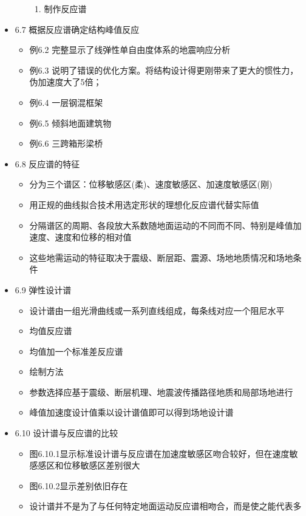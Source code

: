 \documentclass[11pt]{article}
\begin{document}
\begin{itemize}
\begin{itemize}
\begin{enumerate}
\item 制作反应谱
\end{enumerate}
\end{itemize}
\item 6.7 概据反应谱确定结构峰值反应
\label{sec:org07933e7}
\begin{itemize}
\item 例6.2 完整显示了线弹性单自由度体系的地震响应分析
\item 例6.3 说明了错误的优化方案。将结构设计得更刚带来了更大的惯性力，
伪加速度大了5倍；
\item 例6.4 一层钢混框架
\item 例6.5 倾斜地面建筑物
\item 例6.6 三跨箱形梁桥
\end{itemize}
\item 6.8 反应谱的特征
\label{sec:org5a68d4b}
\begin{itemize}
\item 分为三个谱区：位移敏感区(柔)、速度敏感区、加速度敏感区(刚)
\item 用正规的曲线拟合技术用选定形状的理想化反应谱代替实际值
\item 分隔谱区的周期、各段放大系数随地面运动的不同而不同、特别是峰值加
速度、速度和位移的相对值
\item 这些地需运动的特征取决于震级、断层距、震源、场地地质情况和场地条件
\end{itemize}
\item 6.9 弹性设计谱
\label{sec:org625cf59}
\begin{itemize}
\item 设计谱由一组光滑曲线或一系列直线组成，每条线对应一个阻尼水平
\item 均值反应谱
\item 均值加一个标准差反应谱
\item 绘制方法
\item 参数选择应基于震级、断层机理、地震波传播路径地质和局部场地进行
\item 峰值加速度设计值乘以设计谱值即可以得到场地设计谱
\end{itemize}
\item 6.10 设计谱与反应谱的比较
\label{sec:org3f323df}
\begin{itemize}
\item 图6.10.1显示标准设计谱与反应谱在加速度敏感区吻合较好，但在速度敏
感感区和位移敏感区差别很大
\item 图6.10.2显示差别依旧存在
\item 设计谱并不是为了与任何特定地面运动反应谱相吻合，而是使之能代表多

\end{itemize}
\end{itemize}
\end{document}
